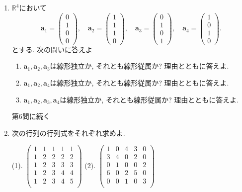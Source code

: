 \documentclass[dvipdfmx,a4paper,11pt]{article}
\newcommand{\R}{\mathbb{R}}
\theoremstyle{definition}
\begin{document}
\begin{enumerate}[label={\Large \textbf{第}\arabic*\textbf{問}.}]
   \item  $\R^4$において
$$
\bm{a}_1=\begin{pmatrix}0\\ 1 \\ 0 \\0\end{pmatrix}, \quad
\bm{a}_2=\begin{pmatrix}1 \\  1\\ 1 \\0\end{pmatrix},  \quad
\bm{a}_3=\begin{pmatrix}0\\  1\\ 0 \\1\end{pmatrix}, \quad
\bm{a}_4=\begin{pmatrix}1 \\ 0\\ 1 \\0\end{pmatrix}.
$$
とする. 次の問いに答えよ
 \begin{enumerate}[label=(\arabic*).]
   \setlength{\parskip}{0cm} 
  \setlength{\itemsep}{0cm}
  \item $\bm{a}_1, \bm{a}_2, \bm{a}_{3}$は線形独立か, それとも線形従属か? 理由とともに答えよ.
  \item $\bm{a}_1, \bm{a}_2, \bm{a}_{4}$は線形独立か, それとも線形従属か? 理由とともに答えよ.
  \item $\bm{a}_1, \bm{a}_2, \bm{a}_{3}, \bm{a}_4$は線形独立か, それとも線形従属か? 理由とともに答えよ. 
\end{enumerate}

  \begin{flushright}
\LARGE{第6問に続く}
\end{flushright}

 \newpage
 
   \item
 次の行列の行列式をそれぞれ求めよ. 
  
 (1). 
 $
 \begin{pmatrix}
1& 1& 1&1&1\\
 1& 2  & 2&2&2\\
1& 2 & 3&3&3\\
1& 2& 3&4&4\\
1& 2& 3&4&5\\
 \end{pmatrix}
 $ 
   (2). 
 $
 \begin{pmatrix}
   1& 0& 4& 3&0\\
  3& 4& 0& 2&0\\
  0& 1& 0  & 0&2\\
  6& 0& 2 & 5&0\\
  0& 0& 1 & 0&3\\
 \end{pmatrix}
  $


\end{enumerate}
\end{document}
